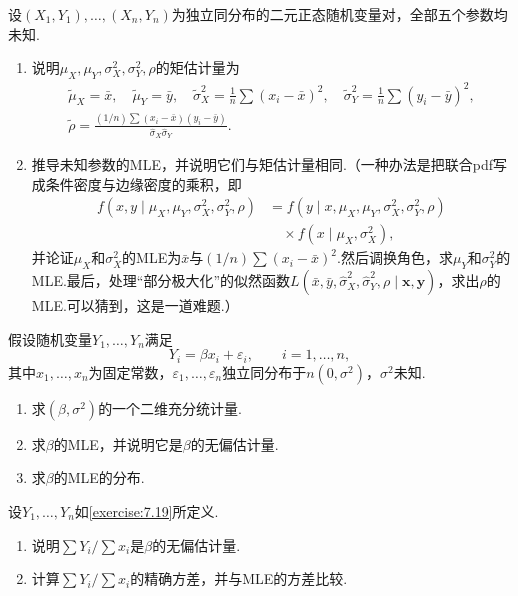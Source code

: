 \begin{exercise}\label{exercise:7.18}
设$(X_1,Y_1),\ldots,(X_n,Y_n)$为独立同分布的二元正态随机变量对，全部五个参数均未知.
\begin{enumerate}[label=(\alph*)]
\item 说明$\mu_X,\mu_Y,\sigma_X^2,\sigma_Y^2,\rho$的矩估计量为
\begin{gather*}
\widetilde\mu_X=\bar x,\quad\widetilde\mu_Y=\bar y,\quad\widetilde\sigma_X^2=\frac1n\sum(x_i-\bar x)^2,\quad\widetilde\sigma_Y^2=\frac1n\sum(y_i-\bar y)^2,\\
\widetilde\rho=\frac{(1/n)\sum(x_i-\bar x)(y_i-\bar y)}{\widehat\sigma_X\widehat\sigma_Y}.
\end{gather*}
\item 推导未知参数的MLE，并说明它们与矩估计量相同.（一种办法是把联合pdf写成条件密度与边缘密度的乘积，即
\begin{align*}
f(x,y\mid\mu_X,\mu_Y,\sigma_X^2,\sigma_Y^2,\rho)
&=f(y\mid x,\mu_X,\mu_Y,\sigma_X^2,\sigma_Y^2,\rho)\\
&\quad\times f(x\mid\mu_X,\sigma_X^2),
\end{align*}
并论证$\mu_X$和$\sigma_X^2$的MLE为$\bar x$与$(1/n)\sum(x_i-\bar x)^2$.然后调换角色，求$\mu_Y$和$\sigma_Y^2$的MLE.最后，处理“部分极大化”的似然函数$L(\bar x,\bar y,\widehat\sigma_X^2,\widehat\sigma_Y^2,\rho\mid\boldsymbol x,\boldsymbol y)$，求出$\rho$的MLE.可以猜到，这是一道难题.）
\end{enumerate}
\end{exercise}
\begin{exercise}\label{exercise:7.19}
假设随机变量$Y_1,\ldots,Y_n$满足
$$Y_i=\beta x_i+\varepsilon_i,\qquad i=1,\ldots,n,$$
其中$x_1,\ldots,x_n$为固定常数，$\varepsilon_1,\ldots,\varepsilon_n$独立同分布于$n(0,\sigma^2)$，$\sigma^2$未知.
\begin{enumerate}[label=(\alph*)]
\item 求$(\beta,\sigma^2)$的一个二维充分统计量.
\item 求$\beta$的MLE，并说明它是$\beta$的无偏估计量.
\item 求$\beta$的MLE的分布.
\end{enumerate}
\end{exercise}
\begin{exercise}\label{exercise:7.20}
设$Y_1,\ldots,Y_n$如\autoref{exercise:7.19}所定义.
\begin{enumerate}[label=(\alph*)]
\item 说明$\sum Y_i/\sum x_i$是$\beta$的无偏估计量.
\item 计算$\sum Y_i/\sum x_i$的精确方差，并与MLE的方差比较.
\end{enumerate}
\end{exercise}
